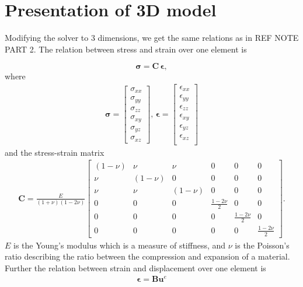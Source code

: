 \section{Presentation of 3D model}
Modifying the solver to 3 dimensions, we get the same relations as in REF NOTE PART 2. The relation between stress and strain over one element is

\begin{equation}
\label{stress-strain}
\bm{\sigma} = \bm{C} \, \bm{\epsilon},
\end{equation}
where
\begin{align*}
\bm{\sigma} =
\begin{bmatrix}
\sigma_{xx} \\
\sigma_{yy} \\
\sigma_{zz} \\
\sigma_{xy} \\
\sigma_{yz} \\
\sigma_{xz}
\end{bmatrix}, \,
\bm{\epsilon} = 
\begin{bmatrix}
\epsilon_{xx} \\
\epsilon_{yy} \\
\epsilon_{zz} \\
\epsilon_{xy} \\
\epsilon_{yz} \\
\epsilon_{xz} \\
\end{bmatrix}
\end{align*}
and the stress-strain matrix \cite{stressMatrix}
\begin{align*}
\bm{C} = \frac{E}{(1+\nu)(1-2\nu)}
\begin{bmatrix}
(1-\nu) & \nu & \nu & 0 & 0 & 0 \\
\nu & (1-\nu) & 0 & 0 & 0 & 0 \\
\nu & \nu & (1-\nu) & 0 & 0 & 0 \\
0 & 0 & 0 & \frac{1-2\nu}{2} & 0 & 0 \\
0 & 0 & 0 & 0 & \frac{1-2\nu}{2} & 0 \\
0 & 0 & 0 & 0 & 0 & \frac{1-2\nu}{2}
\end{bmatrix}.
\end{align*}
$E$ is the Young's modulus which is a measure of stiffness, and $\nu$ is the Poisson's ratio describing the ratio between the compression and expansion of a material. Further the relation between strain and displacement over one element is
\begin{align}
\label{strain-displacement}
\bm{\epsilon} = \bm{B} \bm{u}^e
\end{align}
